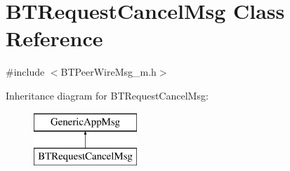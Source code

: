 \hypertarget{classBTRequestCancelMsg}{}\section{B\+T\+Request\+Cancel\+Msg Class Reference}
\label{classBTRequestCancelMsg}


{\ttfamily \#include $<$B\+T\+Peer\+Wire\+Msg\+\_\+m.\+h$>$}

Inheritance diagram for B\+T\+Request\+Cancel\+Msg\+:\begin{figure}[H]
\begin{center}
\leavevmode
\includegraphics[height=2.000000cm]{classBTRequestCancelMsg}
\end{center}
\end{figure}
